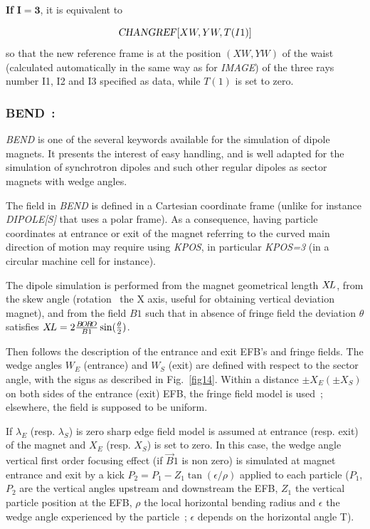 \bigskip

\noindent\textbf{If} $\mathbf{I=3}$,  it is equivalent to 

$$\text{\textsl{CHANGREF}} \lbrack XW,YW,T(I1)\rbrack $$
%
 so that the new reference frame is at the position $ (XW, YW) $ of
the waist (calculated automatically in the same way as for 
\textsl{IMAGE}) of the three rays number I1, I2 and I3 specified as data,  while $T(1)$ is set to zero.
 
\newpage


\subsubsection*{BEND~: \BENDTitl}\label{BEND}  
\medskip

\textsl{BEND}  is one of the several keywords available for the
simulation of dipole magnets. It presents the interest of easy handling, and is well adapted for 
the simulation of synchrotron dipoles and such other regular dipoles as sector magnets with wedge 
angles. 

\bigskip

\noindent The field in \textsl{BEND}  is defined in a Cartesian coordinate frame (unlike for instance \textsl{DIPOLE[S]} 
that uses a polar frame).  As a consequence, having particle coordinates at entrance  or exit of the magnet 
referring to the  curved  main direction of motion may 
require using \textsl{KPOS}, in particular \textsl{KPOS=3}  (in a circular machine cell for instance). 

\bigskip

\noindent The dipole simulation is performed from the magnet geometrical length $ X\!L $, from
 the skew angle (rotation \wrt\ the X axis, useful for obtaining vertical deviation magnet), and from the 
field $ B1 $  such that   in absence of fringe field the deviation $\theta$ satisfies 
$ X\!L = 2 \frac{B\!O\!R\!O}{B1} \sin(\frac{\theta}{2})$. 

\bigskip

\noindent Then follows the description of the entrance and exit EFB's and
fringe fields.       The wedge angles $W_E $ 
(entrance) and $W_S $ (exit) are defined with respect to the sector angle, 
with the signs as described in Fig.~\ref{fig14}.  
Within a distance $ \pm X_E(\pm X_S) $ on both sides of the entrance (exit) EFB, 
the fringe field model is used~; elsewhere, the field is supposed to be uniform. 

\bigskip

\noindent If $\lambda_{E} $ (resp. $\lambda_{S} $) is zero sharp edge field model is assumed at entrance 
(resp. exit) of the magnet and $X_E$ (resp. $X_S$) is set to zero.  In this case, the wedge angle vertical first order 
focusing effect (if $\vec  B1$ is non zero) is simulated at magnet entrance and exit by a kick 
$P_2 = P_1 - Z_1 \tan (\epsilon / \rho)$ applied to each particle ($P_1$, $P_2$ are the vertical angles 
upstream and downstream the EFB, $Z_1$ the vertical particle position at the EFB, $\rho$ the local horizontal 
bending radius and $\epsilon$ the wedge angle experienced by the particle~; $\epsilon$ depends on the horizontal angle T).


